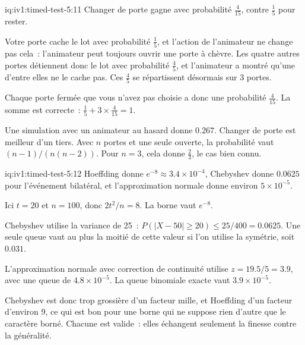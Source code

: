 \begin{solution}{iq:iv1:timed-test-5:11}
Changer de porte gagne avec probabilité $\frac{4}{15}$, contre $\frac15$ pour rester.

Votre porte cache le lot avec probabilité $\frac15$, et l'action de l'animateur ne change pas cela~: l'animateur peut toujours ouvrir une porte à chèvre. Les quatre autres portes détiennent donc le lot avec probabilité $\frac45$, et l'animateur a montré qu'une d'entre elles ne le cache pas. Ces $\frac45$ se répartissent désormais sur 3 portes.

Chaque porte fermée que vous n'avez pas choisie a donc une probabilité $\frac{4}{15}$. La somme est correcte~: $\frac15 + 3 \times \frac{4}{15} = 1$.

Une simulation avec un animateur au hasard donne $0.267$. Changer de porte est meilleur d'un tiers. Avec $n$ portes et une seule ouverte, la probabilité vaut $(n - 1)/(n(n - 2))$. Pour $n = 3$, cela donne $\frac23$, le cas bien connu.

\end{solution}

\begin{solution}{iq:iv1:timed-test-5:12}
Hoeffding donne $e^{-8} \approx 3.4 \times 10^{-4}$, Chebyshev donne $0.0625$ pour l'événement bilatéral, et l'approximation normale donne environ $5 \times 10^{-5}$.

Ici $t = 20$ et $n = 100$, donc $2t^2/n = 8$. La borne vaut $e^{-8}$.

Chebyshev utilise la variance de 25~: $P(|X - 50| \ge 20) \le 25/400 = 0.0625$. Une seule queue vaut au plus la moitié de cette valeur si l'on utilise la symétrie, soit $0.031$.

L'approximation normale avec correction de continuité utilise $z = 19.5/5 = 3.9$, avec une queue de $4.8 \times 10^{-5}$. La queue binomiale exacte vaut $3.9 \times 10^{-5}$.

Chebyshev est donc trop grossière d'un facteur mille, et Hoeffding d'un facteur d'environ 9, ce qui est bon pour une borne qui ne suppose rien d'autre que le caractère borné. Chacune est valide~: elles échangent seulement la finesse contre la généralité.

\end{solution}
